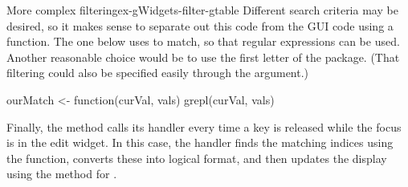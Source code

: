 \begin{example}{More complex filtering}{ex-gWidgets-filter-gtable}
Different search criteria may be desired, so it makes sense to
separate out this code from the GUI code using a function. The one below
uses  to match, so that regular expressions can be
used. Another reasonable choice would be to use the first letter of
the package. (That filtering could also be specified easily through the
 argument.)

\begin{Schunk}
\begin{Sinput}
 ourMatch <- function(curVal, vals) {
   grepl(curVal, vals)
 }
\end{Sinput}
\end{Schunk}

Finally, the  method calls its handler
every time a key is released while the focus is in the edit widget. In
this case, the handler finds the matching indices using the
 function, converts these into logical format, and then
updates the display using the  method for
  .
\begin{Schunk}
\end{Schunk}
\end{example}


